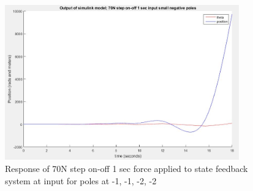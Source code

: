 \documentclass[12pt]{article}
\begin{document}
\begin{center}
\begin{figure}[htb]
	\includegraphics[width=0.9\textwidth]{PBA3_5_70N_response2.jpg}
\caption{Response of 70N step on-off 1 sec force applied to state feedback system at input for poles at -1, -1, -2, -2}
\end{figure}
\end{center}




\clearpage
\end{document}
